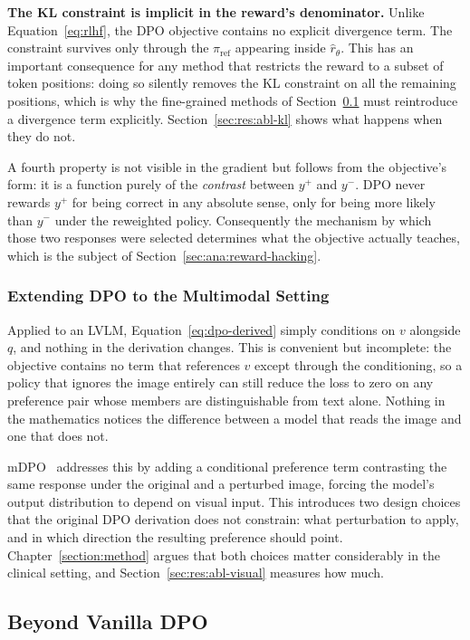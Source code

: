\textbf{The KL constraint is implicit in the reward's denominator.} Unlike Equation~\ref{eq:rlhf}, the DPO objective contains no explicit divergence term. The constraint survives only through the $\pi_{\text{ref}}$ appearing inside $\hat{r}_\theta$. This has an important consequence for any method that restricts the reward to a subset of token positions: doing so silently removes the KL constraint on all the remaining positions, which is why the fine-grained methods of Section~\ref{sec:bg:dpo-variants} must reintroduce a divergence term explicitly. Section~\ref{sec:res:abl-kl} shows what happens when they do not.

A fourth property is not visible in the gradient but follows from the objective's form: it is a function purely of the \emph{contrast} between $y^+$ and $y^-$. DPO never rewards $y^+$ for being correct in any absolute sense, only for being more likely than $y^-$ under the reweighted policy. Consequently the mechanism by which those two responses were selected determines what the objective actually teaches, which is the subject of Section~\ref{sec:ana:reward-hacking}.

\subsubsection{Extending DPO to the Multimodal Setting}

Applied to an LVLM, Equation~\ref{eq:dpo-derived} simply conditions on $v$ alongside $q$, and nothing in the derivation changes. This is convenient but incomplete: the objective contains no term that references $v$ except through the conditioning, so a policy that ignores the image entirely can still reduce the loss to zero on any preference pair whose members are distinguishable from text alone. Nothing in the mathematics notices the difference between a model that reads the image and one that does not.

mDPO~\cite{wang2024mdpo} addresses this by adding a conditional preference term contrasting the same response under the original and a perturbed image, forcing the model's output distribution to depend on visual input. This introduces two design choices that the original DPO derivation does not constrain: what perturbation to apply, and in which direction the resulting preference should point. Chapter~\ref{section:method} argues that both choices matter considerably in the clinical setting, and Section~\ref{sec:res:abl-visual} measures how much.

\subsection{Beyond Vanilla DPO}
\label{sec:bg:dpo-variants}


